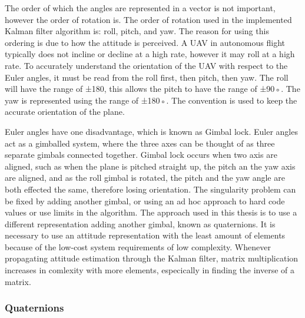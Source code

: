 The order of which the angles are represented in a vector is not important, however the
order of rotation is. The order of rotation used in the implemented Kalman filter algorithm is: roll, pitch, and yaw. The reason for using this ordering is due to how the attitude is perceived. A UAV in autonomous flight typically does not incline or decline at a high rate, however it may roll at a high rate. To accurately understand the orientation of the UAV with respect to the Euler angles, it must be read from the roll first, then pitch, then yaw.
The roll will have the range of ±180, this allows the pitch to have the range of ±90◦. The
yaw is represented using the range of ±180◦. The convention is used to keep the accurate
orientation of the plane.

Euler angles have one disadvantage, which is known as Gimbal lock. Euler angles act
as a gimballed system, where the three axes can be thought of as three separate gimbals
connected together. Gimbal lock occurs when two axis are aligned, such as when the plane
is pitched straight up, the pitch an the yaw axis are aligned, and as the roll gimbal is rotated, the pitch and the yaw angle are both effected the same, therefore losing orientation. The singularity problem can be fixed by adding another gimbal, or using an ad hoc approach to hard code values or use limits in the algorithm. The approach used in this thesis is to use a different representation adding another gimbal, known as quaternions. It is necessary to use an attitude representation with the least amount of elements because of the low-cost system requirements of low complexity. Whenever propagating attitude estimation through the Kalman filter, matrix multiplication increases in comlexity with more elements, especically in finding the inverse of a matrix.

\subsubsection{Quaternions}

